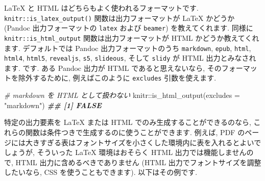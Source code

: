 \documentclass[
  11pt,
]{bxjsreport}
\newenvironment{Shaded}{\begin{snugshade}}{\end{snugshade}}
\newcommand{\AttributeTok}[1]{\textcolor[rgb]{0.77,0.63,0.00}{#1}}
\newcommand{\CommentTok}[1]{\textcolor[rgb]{0.56,0.35,0.01}{\textit{#1}}}
\newcommand{\DocumentationTok}[1]{\textcolor[rgb]{0.56,0.35,0.01}{\textbf{\textit{#1}}}}
\newcommand{\FunctionTok}[1]{\textcolor[rgb]{0.00,0.00,0.00}{#1}}
\newcommand{\NormalTok}[1]{#1}
\newcommand{\SpecialCharTok}[1]{\textcolor[rgb]{0.00,0.00,0.00}{#1}}
\newcommand{\StringTok}[1]{\textcolor[rgb]{0.31,0.60,0.02}{#1}}
\begin{document}
LaTeX と HTML はどちらもよく使われるフォーマットです. \texttt{knitr::is\_latex\_output()} 関数は出力フォーマットが LaTeX かどうか (Pandoc 出力フォーマットの \texttt{latex} および \texttt{beamer}) を教えてくれます. 同様に \texttt{knitr::is\_html\_output} 関数は出力フォーマットが HTML かどうか教えてくれます. デフォルトでは Pandoc 出力フォーマットのうち \texttt{markdown}, \texttt{epub}, \texttt{html}, \texttt{html4}, \texttt{html5}, \texttt{revealjs}, \texttt{s5}, \texttt{slideous}, そして \texttt{slidy} が HTML 出力とみなされます. です. ある Pandoc 出力が HTML であると思えないなら, そのフォーマットを除外するために, 例えばこのように \texttt{excludes} 引数を使えます.

\begin{Shaded}
\begin{Highlighting}[numbers=left,,]
\CommentTok{\# markdown を HTML として扱わない}
\NormalTok{knitr}\SpecialCharTok{::}\FunctionTok{is\_html\_output}\NormalTok{(}\AttributeTok{excludes =} \StringTok{"markdown"}\NormalTok{)}
\DocumentationTok{\#\# [1] FALSE}
\end{Highlighting}
\end{Shaded}

特定の出力要素を LaTeX または HTML でのみ生成することができるのなら, これらの関数は条件つきで生成するのに使うことができます. 例えば, PDF のページには大きすぎる表はフォントサイズを小さくした環境内に表を入れるとよいでしょうが, そういった LaTeX 環境はおそらく HTML 出力では機能しませんので, HTML 出力に含めるべきでありません (HTML 出力でフォントサイズを調整したいなら, CSS を使うこともできます). 以下はその例です.
\end{document}
